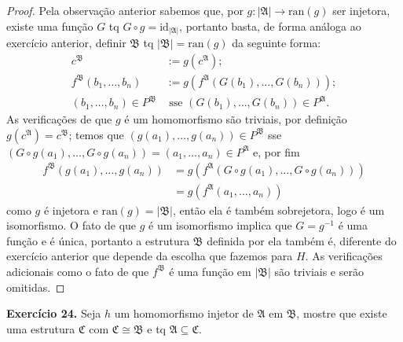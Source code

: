 \documentclass[11pt]{article}
\newcommand{\mf}[1]{\mathfrak{#1}}
\begin{document}
\begin{proof}
    Pela observação anterior sabemos que, por $g:|\mf{A}|\to\text{ran}(g)$ ser injetora, existe uma função $G$ tq $G\circ g=\text{id}_{|\mf{A}|}$, portanto basta, de forma análoga ao exercício anterior, definir $\mf{B}$ tq $|\mf{B}|=\text{ran}(g)$ da seguinte forma:
    \begin{align*}
        c^\mf{B} & := g(c^\mf{A});\\
        f^\mf{B}(b_1,\dots,b_n) & := g\left(f^\mf{A}(G(b_1),\dots,G(b_n))\right);\\
        (b_1,\dots,b_n)\in P^\mf{B} & \text{ sse } (G(b_1),\dots,G(b_n))\in P^\mf{A}.
    \end{align*}
    As verificações de que $g$ é um homomorfismo são triviais, por definição $g(c^\mf{A})=c^\mf{B}$; temos que $(g(a_1),\dots,g(a_n))\in P^\mf{B}$ sse $(G\circ g(a_1),\dots,G\circ g(a_n))=(a_1,\dots,a_n)\in P^\mf{A}$ e, por fim
    \begin{align*}
        f^\mf{B}(g(a_1),\dots,g(a_n)) & =g\left(f^\mf{A}(G\circ g(a_1),\dots,G\circ g(a_n))\right)\\
        & =g\left(f^\mf{A}(a_1,\dots,a_n)\right)    
    \end{align*}
    como $g$ é injetora e $\text{ran}(g)=|\mf{B}|$, então ela é também sobrejetora, logo é um isomorfismo. O fato de que $g$ é um isomorfismo implica que $G=g^{-1}$ é uma função e é única, portanto a estrutura $\mf{B}$ definida por ela também é, diferente do exercício anterior que depende da escolha que fazemos para $H$. As verificações adicionais como o fato de que $f^\mf{B}$ é uma função em $|\mf{B}|$ são triviais e serão omitidas.
\end{proof}

\begin{shaded}
\textbf{Exercício 24.} Seja $h$ um homomorfismo injetor de $\mf{A}$ em $\mf{B}$, mostre que existe uma estrutura $\mf{C}$ com $\mf{C}\cong\mf{B}$ e tq $\mf{A}\subseteq\mf{C}$.
\end{shaded}
\end{document}
